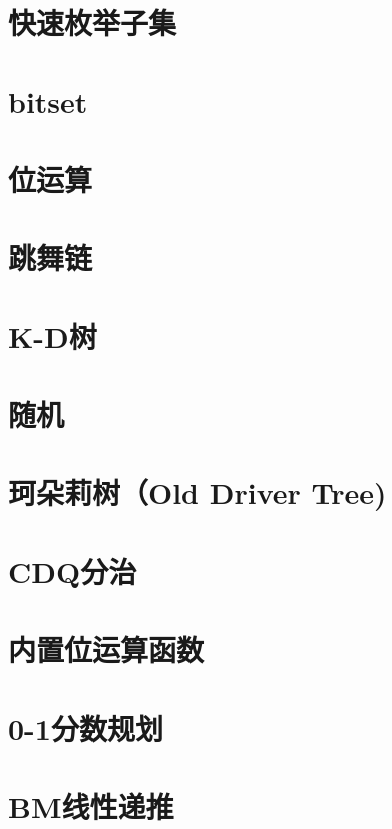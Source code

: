 \section{快速枚举子集}
\raggedbottom
\hrulefill
\section{bitset}
\raggedbottom
\hrulefill
\section{位运算}
\raggedbottom
\hrulefill
\section{跳舞链}
\raggedbottom
\hrulefill
\section{K-D树}
\raggedbottom
\hrulefill
\section{随机}
\raggedbottom
\hrulefill
\section{珂朵莉树（Old Driver Tree)}
\raggedbottom
\hrulefill
\section{CDQ分治}
\raggedbottom
\hrulefill
\section{内置位运算函数}
\raggedbottom
\hrulefill
\section{0-1分数规划}
\raggedbottom
\hrulefill
\section{BM线性递推}
\raggedbottom
\hrulefill


